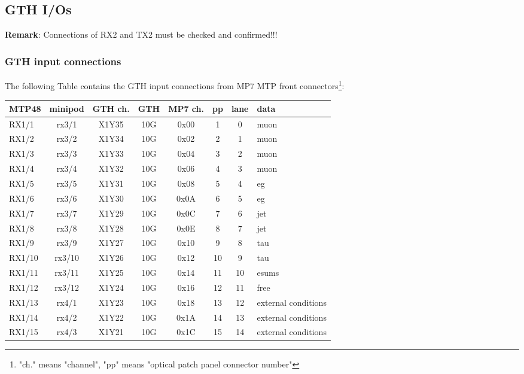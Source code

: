\clearpage
\subsection{GTH I/Os}\label{sec:app:gth_io}

\textbf{Remark}:
Connections of RX2 and TX2 must be checked and confirmed!!!

\subsubsection{GTH input connections}\label{sec:app:gth_i_conn}

The following Table contains the GTH input connections from MP7 MTP front connectors\footnote{"ch." means "channel", "pp" means "optical patch panel connector number"}:

\begin{longtable}{|l|c|c|c|c|c|c|l|}
\hline
\textbf{MTP48}& \textbf{minipod}& \textbf{GTH ch.}& \textbf{GTH}& \textbf{MP7 ch.} &\textbf{pp}& \textbf{lane}& \textbf{data}\\
\hline
\hline
\endhead
RX1/1  & rx3/1  & X1Y35 & 10G & 0x00 & 1  & 0  & muon\\\hline
RX1/2  & rx3/2  & X1Y34 & 10G & 0x02 & 2  & 1  & muon\\\hline
RX1/3  & rx3/3  & X1Y33 & 10G & 0x04 & 3  & 2  & muon\\\hline
RX1/4  & rx3/4  & X1Y32 & 10G & 0x06 & 4  & 3  & muon\\\hline
RX1/5  & rx3/5  & X1Y31 & 10G & 0x08 & 5  & 4  & eg\\\hline
RX1/6  & rx3/6  & X1Y30 & 10G & 0x0A & 6  & 5  & eg\\\hline
RX1/7  & rx3/7  & X1Y29 & 10G & 0x0C & 7  & 6  & jet\\\hline
RX1/8  & rx3/8  & X1Y28 & 10G & 0x0E & 8  & 7  & jet\\\hline
RX1/9  & rx3/9  & X1Y27 & 10G & 0x10 & 9  & 8  & tau\\\hline
RX1/10 & rx3/10 & X1Y26 & 10G & 0x12 & 10 & 9  & tau\\\hline
RX1/11 & rx3/11 & X1Y25 & 10G & 0x14 & 11 & 10 & esums\\\hline
RX1/12 & rx3/12 & X1Y24 & 10G & 0x16 & 12 & 11 & free\\\hline
RX1/13 & rx4/1  & X1Y23 & 10G & 0x18 & 13 & 12 & external conditions\\\hline
RX1/14 & rx4/2  & X1Y22 & 10G & 0x1A & 14 & 13 & external conditions\\\hline
RX1/15 & rx4/3  & X1Y21 & 10G & 0x1C & 15 & 14 & external conditions\\\hline

\end{longtable}
